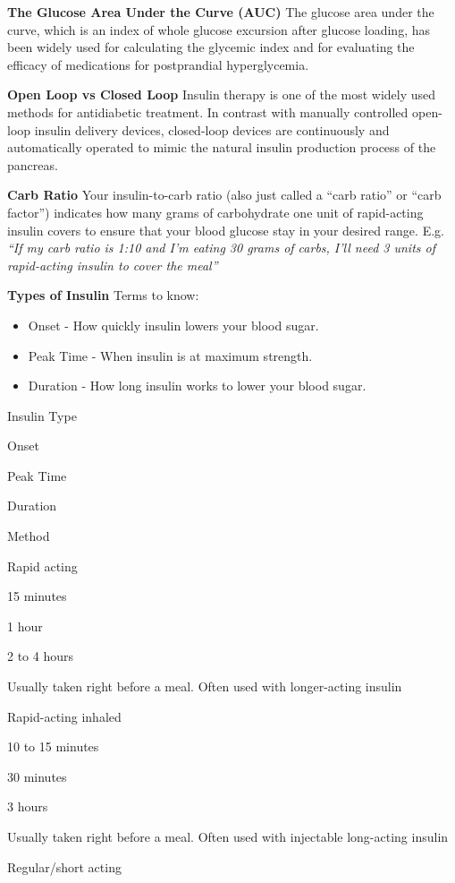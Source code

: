 \documentclass[
]{ctexart}
\providecommand{\tightlist}{%
  \setlength{\itemsep}{0pt}\setlength{\parskip}{0pt}}
\begin{document}
\textbf{The Glucose Area Under the Curve (AUC)} The glucose area under
the curve, which is an index of whole glucose excursion after glucose
loading, has been widely used for calculating the glycemic index and for
evaluating the efficacy of medications for postprandial hyperglycemia.

\textbf{Open Loop vs Closed Loop} Insulin therapy is one of the most
widely used methods for antidiabetic treatment. In contrast with
manually controlled open-loop insulin delivery devices, closed-loop
devices are continuously and automatically operated to mimic the natural
insulin production process of the pancreas.

\textbf{Carb Ratio} Your insulin-to-carb ratio (also just called a
``carb ratio'' or ``carb factor'') indicates how many grams of
carbohydrate one unit of rapid-acting insulin covers to ensure that your
blood glucose stay in your desired range. E.g. \emph{``If my carb ratio
is 1:10 and I'm eating 30 grams of carbs, I'll need 3 units of
rapid-acting insulin to cover the meal''}

\textbf{Types of Insulin} Terms to know:

\begin{itemize}
\tightlist
\item
  Onset - How quickly insulin lowers your blood sugar.
\item
  Peak Time - When insulin is at maximum strength.
\item
  Duration - How long insulin works to lower your blood sugar.
\end{itemize}

Insulin Type

Onset

Peak Time

Duration

Method

Rapid acting

15 minutes

1 hour

2 to 4 hours

Usually taken right before a meal. Often used with longer-acting insulin

Rapid-acting inhaled

10 to 15 minutes

30 minutes

3 hours

Usually taken right before a meal. Often used with injectable
long-acting insulin

Regular/short acting
\end{document}
